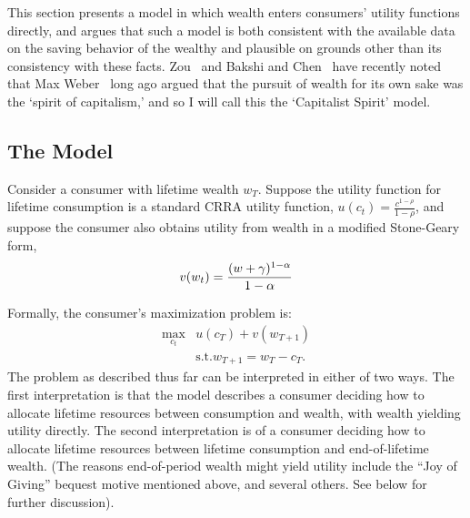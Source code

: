 \documentclass[titlepage,12pt]{article}
\begin{document}
This section presents a model in which wealth enters consumers' 
utility functions directly, and argues that such a model is both 
consistent with the available data on the saving behavior of the 
wealthy and plausible on grounds other than its consistency with 
these facts.  Zou~\citeyear{zou:spirit} and Bakshi and 
Chen~\citeyear{bakshi&chen:spirit} have recently noted that Max 
Weber~\citeyear{weber:capitalism} long ago argued that the pursuit of 
wealth for its own sake was the `spirit of capitalism,' and so I will 
call this the `Capitalist Spirit' model.

\hypertarget{the-model}{}
\subsection{The Model}
\label{subsec:CapitalistModel}

Consider a consumer with lifetime wealth $w_{T}$.  Suppose the utility 
function for lifetime consumption is a standard CRRA utility function, 
$u(c_{t}) = \frac{c^{1-\rho}}{1-\rho}$, and suppose the consumer also 
obtains utility from wealth in a modified Stone-Geary form,
$$
  v(w_{t}) = \frac{(w + \gamma)^{1-\alpha}}{1-\alpha} \notag
$$

Formally, the consumer's maximization problem is:
\begin{eqnarray}
 	\max_{c_{t}} & u(c_{T}) + v(w_{T+1}) \\ \nonumber
  	           & \mbox{s.t.} w_{T+1} = w_{T} - c_{T}.  \nonumber
	\label{eq:LastPeriodProb}
\end{eqnarray}
The problem as described thus far can be interpreted in either of two 
ways.  The first interpretation is that the model describes a consumer 
deciding how to allocate lifetime resources between consumption and 
wealth, with wealth yielding utility directly.  The second 
interpretation is of a consumer deciding how to allocate lifetime 
resources between lifetime consumption and end-of-lifetime wealth.  
(The reasons end-of-period wealth might yield utility include the ``Joy 
of Giving'' bequest motive mentioned above, and several others.  See 
below for further discussion).  
\end{document}
